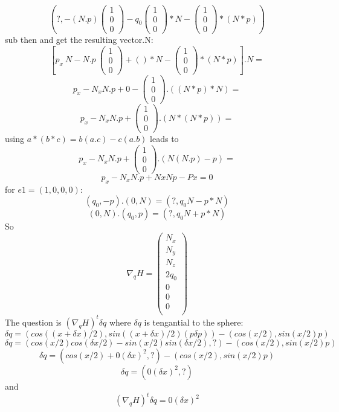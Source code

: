 \[\left(?,-(N.p)\left(\begin{array}{c}1\\0\\0\end{array}\right)-q_0 \left(\begin{array}{c}1\\0\\0\end{array}\right)*N-\left(\begin{array}{c}1\\0\\0\end{array}\right)*(N*p)\right)\]
sub then and get the resulting vector.N:
\[\left[ p_x~N -N.p~\left(\begin{array}{c}1\\0\\0\end{array}\right)+()*N-\left(\begin{array}{c}1\\0\\0\end{array}\right)*(N*p)\right].N=\]
\[p_x-N_xN.p+0-\left(\begin{array}{c}1\\0\\0\end{array}\right).((N*p)*N)=\]
  \[p_x-N_xN.p+\left(\begin{array}{c}1\\0\\0\end{array}\right).(N*(N*p))=\]
    using $a*(b*c)=b(a.c)-c(a.b)$ leads to
    \[p_x-N_xN.p+\left(\begin{array}{c}1\\0\\0\end{array}\right).(N(N.p)-p)=\]
\[p_x-N_xN.p+NxNp-Px=0\]
for $e1=(1,0,0,0)$:
\[(q_0,-p).(0,N)=(?,q_0N-p*N)\]
\[(0,N).(q_0,p)=(?,q_0N+p*N)\]
So
\[\nabla _q H =\left(\begin{array}{c} N_x\\N_y\\N_z\\
2q_0\\
0\\
0\\
0\\
\end{array}\right)\]
The question is $(\nabla _q H)^t \delta q$ where $\delta q $ is tengantial to the sphere:
\[\delta q=(cos((x+\delta x)/2),sin((x+\delta x)/2)(p \delta p))-(cos(x/2),sin(x/2)p)\]
\[\delta q=(cos(x/2)cos(\delta x /2)-sin(x/2)sin(\delta x /2),?)-(cos(x/2),sin(x/2)p)\]
\[\delta q = (cos(x/2) +0(\delta x)^2,?)-(cos(x/2),sin(x/2)p)\]
\[\delta q = (0(\delta x)^2,?)\]
and
\[(\nabla _q H)^t \delta q = 0(\delta x)^2\]

